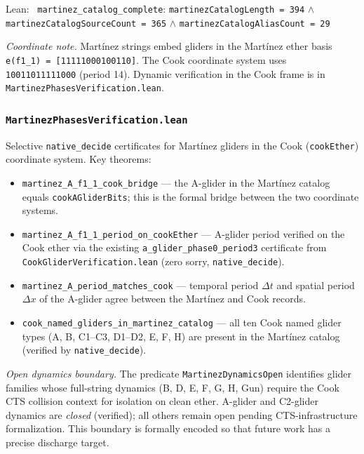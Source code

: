 \documentclass[11pt,a4paper]{article}
\newenvironment{leanref}%
  {\par\smallskip\noindent\begingroup\raggedright\textup{Lean:}~}%
  {\par\endgroup}
\theoremstyle{definition}
\begin{document}
\begin{leanref}
\lstinline|martinez_catalog_complete|: \lstinline|martinezCatalogLength = 394|
$\wedge$ \lstinline|martinezCatalogSourceCount = 365|
$\wedge$ \lstinline|martinezCatalogAliasCount = 29|
\end{leanref}

\textit{Coordinate note.} Mart\'{i}nez strings embed gliders in the
Mart\'{i}nez ether basis \texttt{e(f1\_1) = [11111000100110]}.
The Cook coordinate system uses \texttt{10011011111000} (period 14).
Dynamic verification in the Cook frame is in
\lstinline|MartinezPhasesVerification.lean|.

\subsubsection*{\texttt{MartinezPhasesVerification.lean}}

Selective \lstinline|native_decide| certificates for Mart\'{i}nez gliders
in the Cook (\lstinline|cookEther|) coordinate system.  Key theorems:

\begin{itemize}[nosep]
\item \lstinline|martinez_A_f1_1_cook_bridge| --- the A-glider in the
  Mart\'{i}nez catalog equals \lstinline|cookAGliderBits|; this is the
  formal bridge between the two coordinate systems.
\item \lstinline|martinez_A_f1_1_period_on_cookEther| --- A-glider
  period verified on the Cook ether via the existing
  \lstinline|a_glider_phase0_period3| certificate from
  \lstinline|CookGliderVerification.lean| (zero sorry, \lstinline|native_decide|).
\item \lstinline|martinez_A_period_matches_cook| --- temporal period
  $\Delta t$ and spatial period $\Delta x$ of the A-glider agree between
  the Mart\'{i}nez and Cook records.
\item \lstinline|cook_named_gliders_in_martinez_catalog| --- all ten
  Cook named glider types (A, B, C1--C3, D1--D2, E, F, H) are present in
  the Mart\'{i}nez catalog (verified by \lstinline|native_decide|).
\end{itemize}

\noindent\textit{Open dynamics boundary.}
The predicate \lstinline|MartinezDynamicsOpen| identifies glider families
whose full-string dynamics (B, D, E, F, G, H, Gun) require the Cook CTS
collision context for isolation on clean ether.  A-glider and C2-glider
dynamics are \emph{closed} (verified); all others remain open pending
CTS-infrastructure formalization.  This boundary is formally encoded so
that future work has a precise discharge target.
\end{document}
